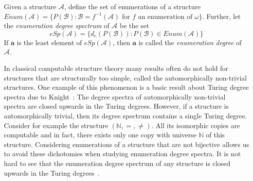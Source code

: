 \documentclass[11pt]{amsart}
\newcommand{\A}{{\mathcal{A}}}
\newcommand{\B}{{\mathcal{B}}}
\begin{document}
\begin{defn}\label{def:enumerationspectrum}
  Given a structure $\A$, define the set of enumerations of a structure $Enum(\A)=\{P(\B): \B = f^{-1}(\A) \text{ for } f \text{ an enumeration of } \omega\}$.
  Further, let the \emph{enumeration degree spectrum} of $\A$ be the set
    \[ eSp(\A)=\{ d_e(P(\B)): P(\B)\in Enum(\A)\}\]
  If $\mathbf a$ is the least element of $eSp(\A)$, then $\mathbf a$ is called the
  \emph{enumeration degree} of $\A$.
\end{defn}
In classical computable structure theory many results often do not hold for structures that are structurally too simple, called the automorphically non-trivial structures. One example of this phenomenon is a basic result about Turing degree spectra due to Knight~\cite{knight1986}: The degree spectra of automorphically non-trivial spectra are closed upwards in the Turing degrees. However, if a structure is automorphically trivial, then its degree spectrum contains a single Turing degree. Consider for example the structure $(\mathbb N,=,\neq)$. All its isomorphic copies are computable and in fact, there exists only one copy with universe $\mathbb N$ of this structure.
Considering enumerations of a structure that are not bijective allows us to avoid these dichotomies when studying enumeration degree spectra. It is not hard to see that the enumeration degree spectrum of any structure is closed upwards in the Turing degrees~\cite[Proposition 2.6]{soskov2004}.
\end{document}
